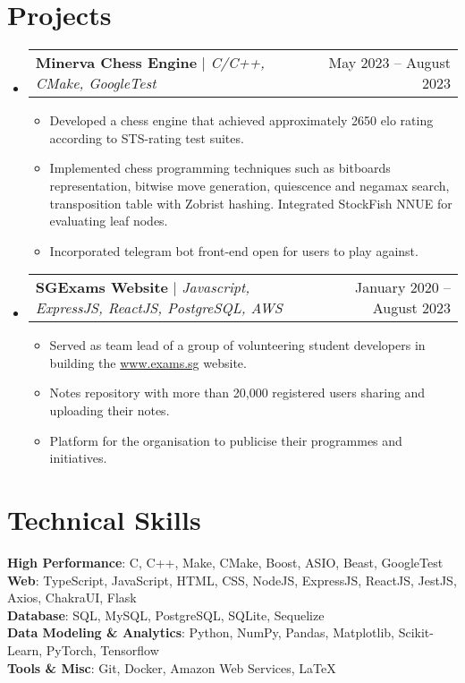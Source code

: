 \documentclass[letterpaper,11pt]{article}
\makeatletter
\newcommand{\resumeItem}[1]{
  \item\footnotesize{
    {#1 \vspace{-2pt}}
  }
}
\newcommand{\resumeProjectHeading}[2]{
    \item
    \begin{tabular*}{0.97\textwidth}{l@{\extracolsep{\fill}}r}
      \small#1 & #2 \\
    \end{tabular*}\vspace{-6pt}
}
\newcommand{\resumeSubHeadingListStart}{\begin{itemize}[leftmargin=0.15in, label={}]}
\newcommand{\resumeSubHeadingListEnd}{\end{itemize}}
\newcommand{\resumeItemListStart}{\begin{itemize}}
\newcommand{\resumeItemListEnd}{\end{itemize}\vspace{-7pt}}
\makeatother
\begin{document}
\section{Projects}
    \resumeSubHeadingListStart
      \resumeProjectHeading
          {\textbf{Minerva Chess Engine} $|$ \emph{C/C++, CMake, GoogleTest}}{May 2023 -- August 2023}
          \resumeItemListStart
            \resumeItem{Developed a chess engine that achieved approximately 2650 elo rating according to STS-rating test suites.}
            \resumeItem{Implemented chess programming techniques such as bitboards representation, bitwise move generation, quiescence and negamax search, transposition table with Zobrist hashing. Integrated StockFish NNUE for evaluating leaf nodes.}
            \resumeItem{Incorporated telegram bot front-end open for users to play against.}
          \resumeItemListEnd
      \resumeProjectHeading
          {\textbf{SGExams Website} $|$ \emph{Javascript, ExpressJS, ReactJS, PostgreSQL, AWS}}{January 2020 -- August 2023}
          \resumeItemListStart
            \resumeItem{Served as team lead of a group of volunteering student developers in building the \href{https://www.exams.sg}{www.exams.sg} website.}
            \resumeItem{Notes repository with more than 20,000 registered users sharing and uploading their notes.}
            \resumeItem{Platform for the organisation to publicise their programmes and initiatives.}
          \resumeItemListEnd
    \resumeSubHeadingListEnd

\section{Technical Skills}
 \begin{itemize}[leftmargin=0.15in, label={}]
    \footnotesize{\item{
     \textbf{High Performance}{: C, C++, Make, CMake, Boost, ASIO, Beast, GoogleTest} \\
     \textbf{Web}{: TypeScript, JavaScript, HTML, CSS, NodeJS, ExpressJS, ReactJS, JestJS, Axios, ChakraUI, Flask} \\
     \textbf{Database}{: SQL, MySQL, PostgreSQL, SQLite, Sequelize} \\
     \textbf{Data Modeling \& Analytics}{: Python, NumPy, Pandas, Matplotlib, Scikit-Learn, PyTorch, Tensorflow} \\
     \textbf{Tools \& Misc}{: Git, Docker, Amazon Web Services, \LaTeX} \\
    }}
 \end{itemize}

\end{document}
